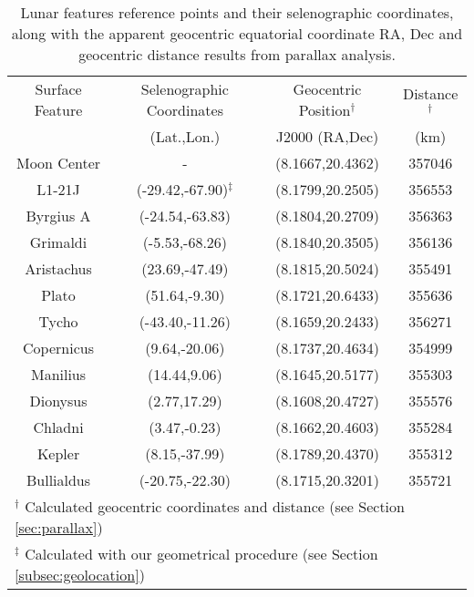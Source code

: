 
\begin{table*}
\centering
\begin{tabular}{cccc}
\hline\hline
Surface Feature & Selenographic Coordinates & Geocentric Position$^\dagger$ & Distance$^\dagger$ \\
                & (Lat.,Lon.)               & J2000 (RA,Dec)      & (km)     \\\hline
Moon Center & - & (8.1667,20.4362) & 357046\\
L1-21J & (-29.42,-67.90)$^\ddagger$ & (8.1799,20.2505) & 356553\\
Byrgius A & (-24.54,-63.83) & (8.1804,20.2709) & 356363\\
Grimaldi & (-5.53,-68.26) & (8.1840,20.3505) & 356136\\
Aristachus & (23.69,-47.49) & (8.1815,20.5024) & 355491\\
Plato & (51.64,-9.30) & (8.1721,20.6433) & 355636\\
Tycho & (-43.40,-11.26) & (8.1659,20.2433) & 356271\\
Copernicus & (9.64,-20.06) & (8.1737,20.4634) & 354999\\
Manilius & (14.44,9.06) & (8.1645,20.5177) & 355303\\
Dionysus & (2.77,17.29) & (8.1608,20.4727) & 355576\\
Chladni & (3.47,-0.23) & (8.1662,20.4603) & 355284\\
Kepler & (8.15,-37.99) & (8.1789,20.4370) & 355312\\
Bullialdus & (-20.75,-22.30) & (8.1715,20.3201) & 355721\\

\hline\hline
\multicolumn{4}{l}{\footnotesize $^\dagger$ Calculated geocentric coordinates and distance (see Section \ref{sec:parallax})}\\
\multicolumn{4}{l}{\footnotesize $^\ddagger$ Calculated with our geometrical procedure (see Section \ref{subsec:geolocation})}\\
\end{tabular}
\caption{Lunar features reference points and their selenographic coordinates, along with the apparent geocentric equatorial coordinate RA, Dec and geocentric distance results from parallax analysis.}
\label{tab:surfacefeatures}
\end{table*}
